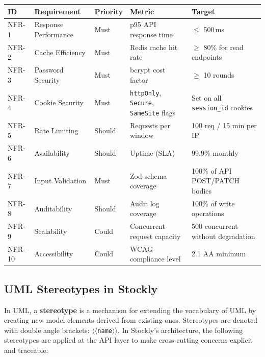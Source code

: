 \documentclass[12pt,a4paper]{report}
\begin{document}
\begin{longtable}{p{}p{}p{}p{}p{}}
    \toprule
    \textbf{ID} & \textbf{Requirement} & \textbf{Priority} & \textbf{Metric} & \textbf{Target} \\
    \midrule
    \endhead
    NFR-1 & Response Performance & Must & p95 API response time & $\leq$ 500\,ms \\
    NFR-2 & Cache Efficiency & Must & Redis cache hit rate & $\geq$ 80\% for read endpoints \\
    NFR-3 & Password Security & Must & bcrypt cost factor & $\geq$ 10 rounds \\
    NFR-4 & Cookie Security & Must & \texttt{httpOnly}, \texttt{Secure}, \texttt{SameSite} flags & Set on all \texttt{session\_id} cookies \\
    NFR-5 & Rate Limiting & Should & Requests per window & 100 req / 15 min per IP \\
    NFR-6 & Availability & Should & Uptime (SLA) & 99.9\% monthly \\
    NFR-7 & Input Validation & Must & Zod schema coverage & 100\% of API POST/PATCH bodies \\
    NFR-8 & Auditability & Should & Audit log coverage & 100\% of write operations \\
    NFR-9 & Scalability & Could & Concurrent request capacity & 500 concurrent without degradation \\
    NFR-10 & Accessibility & Could & WCAG compliance level & 2.1 AA minimum \\
    \bottomrule
\end{longtable}

\subsection{UML Stereotypes in Stockly}

In UML, a \textbf{stereotype} is a mechanism for extending the vocabulary of UML by creating new model elements derived from existing ones. Stereotypes are denoted with double angle brackets: \texttt{$\langle\langle$name$\rangle\rangle$}. In Stockly's architecture, the following stereotypes are applied at the API layer to make cross-cutting concerns explicit and traceable:
\end{document}
